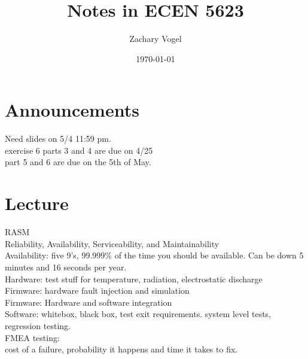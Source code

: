 \documentclass{article}
\author{Zachary Vogel}
\date{\today}
\title{Notes in ECEN 5623}
\begin{document}
\maketitle


\section*{Announcements}
Need slides on 5/4 11:59 pm.\\
exercise 6 parts 3 and 4 are due on 4/25\\
part 5 and 6 are due on the 5th of May.\\

\section*{Lecture}
RASM\\
Reliability, Availability, Serviceability, and Maintainability\\

Availability: five 9's, 99.999\% of the time you should be available. Can be down 5 minutes and 16 seconds per year.\\


Hardware: test stuff for temperature, radiation, electrostatic discharge\\

Firmware: hardware fault injection and simulation\\
Firmware: Hardware and software integration\\

Software: whitebox, black box, test exit requirements. system level tests, regression testing.\\

FMEA testing:\\
cost of a failure, probability it happens and time it takes to fix.
\end{document}
